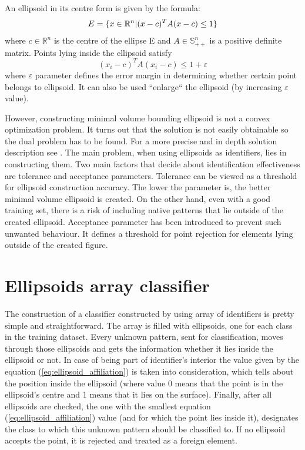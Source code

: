An ellipsoid in its centre form is given by the formula:
\vspace{-6pt} 
\[ 
\vspace{-3pt}
E = \{x \in \mathbb{R}^{n} | (x - c)^{T}A(x-c) \le 1\} 
\vspace{-3pt}
\] 
where $c \in \mathbb{R}^{n}$ is the centre of the ellipse E and $ A \in \mathbb{S}^{n}_{++}$ is a positive definite matrix. Points lying inside the ellipsoid satisfy 
\begin{equation}\label{eq:ellipsoid_affiliation}(x_{i} - c)^{T}A(x_{i} - c) \le 1 + \varepsilon\end{equation}
where $\varepsilon$ parameter defines the error margin in determining whether certain point belongs to ellipsoid. It can also be used ``enlarge`` the ellipsoid (by increasing $\varepsilon$ value).%

However, constructing minimal volume bounding ellipsoid is not a convex optimization problem. It turns out that the solution is not easily obtainable so the dual problem has to be found. For a more precise and in depth solution description see \cite{MVEEMichaelTodd2005}. The main problem, when using ellipsoids as identifiers, lies in constructing them. Two main factors that decide about identification effectiveness are tolerance and acceptance parameters. Tolerance can be viewed as a threshold for ellipsoid construction accuracy. The lower the parameter is, the better minimal volume ellipsoid is created. On the other hand, even with a good training set, there is a risk of including native patterns that lie outside of the created ellipsoid. Acceptance parameter has been introduced to prevent such unwanted behaviour. It defines a threshold for point rejection for elements lying outside of the created figure.

\section{Ellipsoids array classifier}

The construction of a classifier constructed by using array of identifiers is pretty simple and straightforward. The array is filled with ellipsoids, one for each class in the training dataset. Every unknown pattern, sent for classification, moves through those ellipsoids and gets the information whether it lies inside the ellipsoid or not. In case of being part of identifier's interior the value given by the equation (\ref{eq:ellipsoid_affiliation}) is taken into consideration, which tells about the position inside the ellipsoid (where value 0 means that the point is in the ellipsoid's centre and 1 means that it lies on the surface). Finally, after all ellipsoids are checked, the one with the smallest equation (\ref{eq:ellipsoid_affiliation}) value (and for which the point lies inside it), designates the class to which this unknown pattern should be classified to. If no ellipsoid accepts the point, it is rejected and treated as a foreign element.

